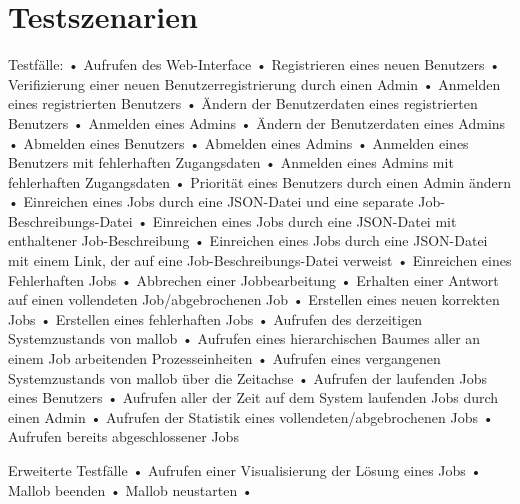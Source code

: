 \section{Testszenarien}

Testfälle:
•	Aufrufen des Web-Interface
•	Registrieren eines neuen Benutzers
•	Verifizierung einer neuen Benutzerregistrierung durch einen Admin
•	Anmelden eines registrierten Benutzers
•	Ändern der Benutzerdaten eines registrierten Benutzers
•	Anmelden eines Admins
•	Ändern der Benutzerdaten eines Admins
•	Abmelden eines Benutzers
•	Abmelden eines Admins
•	Anmelden eines Benutzers mit fehlerhaften Zugangsdaten
•	Anmelden eines Admins mit fehlerhaften Zugangsdaten
•	Priorität eines Benutzers durch einen Admin ändern
•	Einreichen eines Jobs durch eine JSON-Datei und eine separate Job-Beschreibungs-Datei
•	Einreichen eines Jobs durch eine JSON-Datei mit enthaltener Job-Beschreibung
•	Einreichen eines Jobs durch eine JSON-Datei mit einem Link, der auf eine Job-Beschreibungs-Datei verweist
•	Einreichen eines Fehlerhaften Jobs
•	Abbrechen einer Jobbearbeitung
•	Erhalten einer Antwort auf einen vollendeten Job/abgebrochenen Job
•	Erstellen eines neuen korrekten Jobs
•	Erstellen eines fehlerhaften Jobs
•	Aufrufen des derzeitigen Systemzustands von mallob
•	Aufrufen eines hierarchischen Baumes aller an einem Job arbeitenden Prozesseinheiten 
•	Aufrufen eines vergangenen Systemzustands von mallob über die Zeitachse
•	Aufrufen der laufenden Jobs eines Benutzers
•	Aufrufen aller der Zeit auf dem System laufenden Jobs durch einen Admin
•	Aufrufen der Statistik eines vollendeten/abgebrochenen Jobs
•	Aufrufen bereits abgeschlossener Jobs 

Erweiterte Testfälle
•	Aufrufen einer Visualisierung der Lösung eines Jobs
•	Mallob beenden
•	Mallob neustarten
•	